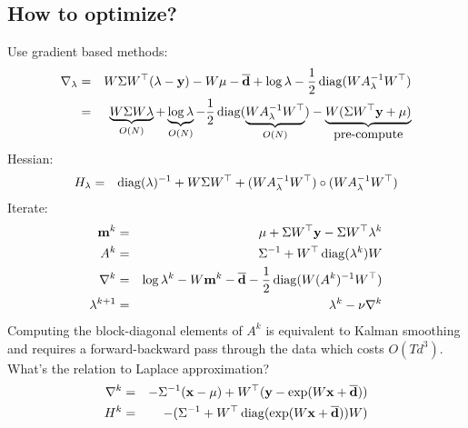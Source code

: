 \documentclass[10pt,english]{article}
\begin{document}
\subsection{How to optimize?}
Use gradient based methods:
\begin{eqnarray*}
 \nabla_\lambda		&=&		W\Sigma W^\top (\lambda-\mathbf{y})-W\mu-\overline{\mathbf{d}}+\log\lambda-\frac{1}{2}\operatorname{diag}(WA^{-1}_\lambda W^\top)\\
			&=&		\underbrace{W\Sigma W \lambda}_{O(N)}+\underbrace{\log\lambda}_{O(N)}-\frac{1}{2}\operatorname{diag}(\underbrace{WA^{-1}_\lambda W^\top}_{O(N)})-\underbrace{W(\Sigma W^\top\mathbf{y}+\mu)}_{\mbox{pre-compute}}
\end{eqnarray*}
Hessian:
\begin{eqnarray*}
 H_\lambda		&=&		\operatorname{diag}(\lambda)^{-1}+W\Sigma W^\top + (WA^{-1}_\lambda W^\top)\circ(WA^{-1}_\lambda W^\top)
\end{eqnarray*}
Iterate:
\begin{eqnarray*}
 \mathbf{m}^k			&=&		\mu+\Sigma W^\top\mathbf{y}-\Sigma W^\top\lambda^k\\
 A^k			&=&		\Sigma^{-1}+W^\top \operatorname{diag}(\lambda^k)W\\
 \nabla^k		&=&		\log\lambda^k-W\mathbf{m}^k-\overline{\mathbf{d}}-\frac{1}{2}\operatorname{diag}(W(A^k)^{-1}W^\top)\\
 \lambda^{k+1}		&=&		\lambda^{k}-\nu \nabla^k
\end{eqnarray*}
Computing the block-diagonal elements of $A^k$ is equivalent to Kalman smoothing and requires a forward-backward pass through the data which costs $O(Td^3)$.\\
What's the relation to Laplace approximation?
\begin{eqnarray*}
 \nabla^k		&=&		-\Sigma^{-1}(\mathbf{x}-\mu)+W^\top(\mathbf{y}-\exp(W\mathbf{x}+\overline{\mathbf{d}})) \\
 H^k			&=&		-(\Sigma^{-1}+W^\top \operatorname{diag}(\exp(W\mathbf{x}+\overline{\mathbf{d}}))W)
\end{eqnarray*}
\end{document}
